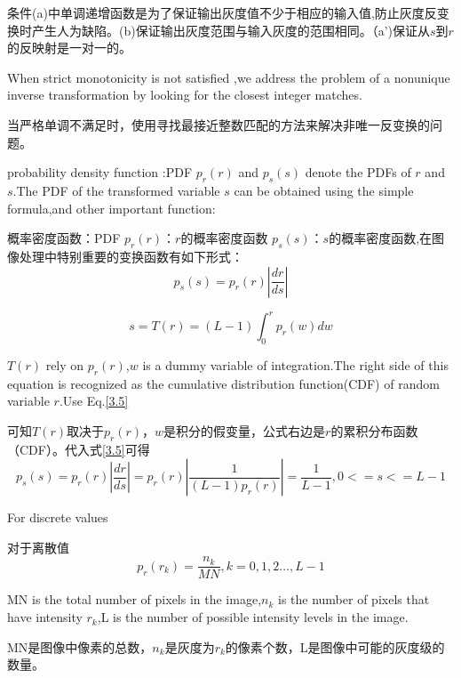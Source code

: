 \documentclass[12pt]{article}
\numberwithin{equation}{section}%
\begin{document}
条件(a)中单调递增函数是为了保证输出灰度值不少于相应的输入值,防止灰度反变换时产生人为缺陷。(b)保证输出灰度范围与输入灰度的范围相同。（a')保证从$s$到$r$的反映射是一对一的。

When strict monotonicity is not satisfied ,we address the problem of a nonunique inverse transformation by looking for the closest integer matches.

当严格单调不满足时，使用寻找最接近整数匹配的方法来解决非唯一反变换的问题。

probability density function :PDF  \qquad  $p_{r}(r)$ and $p_{s}(s)$ denote the PDFs of $r$ and $s$.The PDF of the transformed variable $s$ can be obtained using the simple formula,and other important function:

概率密度函数：PDF \qquad $p_{r}(r)$：$r$的概率密度函数 \quad $p_{s}(s)$：$s$的概率密度函数,在图像处理中特别重要的变换函数有如下形式：
\begin{equation}  \label{3.5}  %
 p_{s}(s)=p_{r}(r)\left| \frac{dr}{ds} \right|
\end{equation}

\begin{equation} \label{3.6}   %
 s=T(r)=(L-1)\int_{0}^{r}p_{r}(w)dw 
\end{equation}

$T(r)$ rely on $p_{r}(r)$,$w$ is a dummy variable of integration.The right side of this equation is recognized as the cumulative  distribution function(CDF) of random variable $r$.Use Eq.\ref{3.5}

可知$T(r)$取决于$p_{r}(r)$，$w$是积分的假变量，公式右边是$r$的累积分布函数（CDF）。代入式\ref{3.5}可得
\begin{equation}  \label{3.7}  %
 p_{s}(s)=p_{r}(r)\left| \frac{dr}{ds} \right|=p_{r}(r)\left| \frac{1}{(L-1)p_{r}(r)} \right|=\frac{1}{L-1},0<=s<=L-1
\end{equation}

For discrete values

对于离散值
\begin{equation}    \label{3.8} %
 p_{r}(r_{k})= \frac{n_{k}}{MN},k=0,1,2\ldots,L-1
\end{equation}

MN is the total number of pixels in the image,$n_{k}$ is the number of pixels that have intensity $r_{k}$,L is the number of possible intensity levels in the image.

MN是图像中像素的总数，$n_{k}$是灰度为$r_{k}$的像素个数，L是图像中可能的灰度级的数量。
\end{document}
